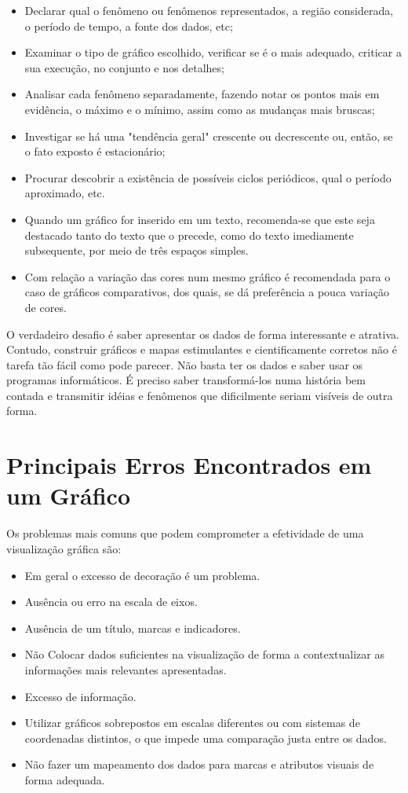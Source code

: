 \begin{itemize}
\item Declarar qual o fenômeno ou fenômenos representados, a região considerada, o período de tempo, a fonte dos dados, etc;
\item Examinar o tipo de gráfico escolhido, verificar se é o mais adequado, criticar a sua execução, no conjunto e nos detalhes;
\item Analisar cada fenômeno separadamente, fazendo notar os pontos mais em evidência, o máximo e o mínimo, assim como as mudanças mais bruscas; \item Investigar se há uma "tendência geral" crescente ou decrescente ou, então, se o fato exposto é estacionário; 
\item Procurar descobrir a existência de possíveis ciclos periódicos, qual o período aproximado, etc. 
\item Quando um gráfico for inserido em um texto, recomenda-se que este seja destacado tanto do texto que o precede, como do texto imediamente subsequente, por meio de três espaços simples. \item Com relação a variação das cores num mesmo gráfico é recomendada para o caso de gráficos comparativos, dos quais, se dá preferência a pouca variação de cores.
\end{itemize}

O verdadeiro desafio é saber apresentar os dados de forma interessante e atrativa. Contudo, construir gráficos e mapas estimulantes e cientificamente corretos não é tarefa tão fácil como pode parecer. Não basta ter os dados e saber usar os programas informáticos. É preciso saber transformá-los numa história bem contada e transmitir idéias e fenômenos que dificilmente seriam visíveis de outra forma.


\section{Principais Erros Encontrados em um Gráfico}

Os problemas mais comuns que podem comprometer a efetividade de uma visualização gráfica são:


\begin{itemize}
\item Em geral o excesso de decoração é um problema.
\item Ausência ou erro na escala de eixos.
\item Ausência de um título, marcas e indicadores.
\item Não Colocar dados suficientes na visualização de forma a contextualizar as informações mais relevantes apresentadas.
\item Excesso de informação.
\item  Utilizar gráficos sobrepostos em escalas diferentes ou com sistemas de coordenadas distintos, o que impede uma comparação justa entre os dados.
\item Não fazer um mapeamento dos dados para marcas e atributos visuais de forma adequada.
\end{itemize}

